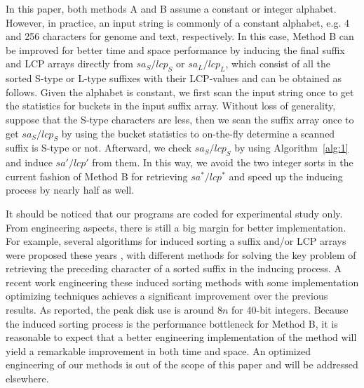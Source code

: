 \documentclass[10pt,journal,compsoc]{IEEEtran}
\begin{document}

In this paper, both methods A and B assume a constant or integer alphabet. However, in practice, an input string is commonly of a constant alphabet, e.g. 4 and 256 characters for genome and text, respectively. In this case, Method B can be improved for better time and space performance by inducing the final suffix and LCP arrays directly from $sa_S/lcp_S$ or $sa_L/lcp_L$, which consist of all the sorted S-type or L-type suffixes with their LCP-values and can be obtained as follows. Given the alphabet is constant, we first scan the input string once to get the statistics for buckets in the input suffix array. Without loss of generality, suppose that the S-type characters are less, then we scan the suffix array once to get $sa_S/lcp_S$ by using the bucket statistics to on-the-fly determine a scanned suffix is S-type or not. Afterward, we check $sa_S/lcp_S$ by using Algorithm~\ref{alg:1} and induce $sa'/lcp'$ from them. In this way, we avoid the two integer sorts in the current fashion of Method B for retrieving $sa^*/lcp^*$ and speed up the inducing process by nearly half as well.

It should be noticed that our programs are coded for experimental study only. From engineering aspects, there is still a big margin for better implementation. For example, several algorithms for induced sorting a suffix and/or LCP arrays were proposed these years \cite{Nong15,Nong14,Bingmann12}, with different methods for solving the key problem of retrieving the preceding character of a sorted suffix in the inducing process. A recent work \cite{Karkkainen2017} engineering these induced sorting methods with some implementation optimizing techniques achieves a significant improvement over the previous results. As reported, the peak disk use is around $8n$ for 40-bit integers. Because the induced sorting process is the performance bottleneck for Method B, it is reasonable to expect that a better engineering implementation of the method will yield a remarkable improvement in both time and space. An optimized engineering of our methods is out of the scope of this paper and will be addressed elsewhere.
\end{document}
